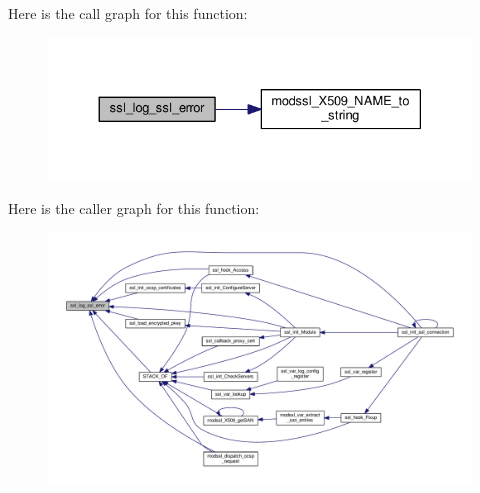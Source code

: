 Here is the call graph for this function\+:
\nopagebreak
\begin{figure}[H]
\begin{center}
\leavevmode
\includegraphics[width=330pt]{group__MOD__SSL__PRIVATE_ga9a4071d17f72df0574d3c8840886d3bb_cgraph}
\end{center}
\end{figure}




Here is the caller graph for this function\+:
\nopagebreak
\begin{figure}[H]
\begin{center}
\leavevmode
\includegraphics[width=350pt]{group__MOD__SSL__PRIVATE_ga9a4071d17f72df0574d3c8840886d3bb_icgraph}
\end{center}
\end{figure}


